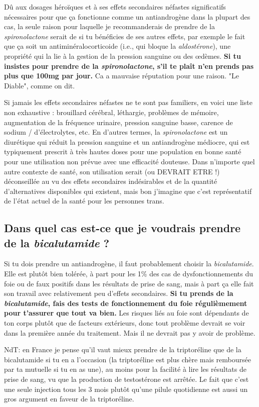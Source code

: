 \documentclass{article}
\begin{document}
Dû aux dosages héroïques et à ses effets secondaires néfastes significatifs nécessaires pour que ça fonctionne comme un antiandrogène dans la plupart des cas, la seule raison pour laquelle je recommanderais de prendre de la \textit{spironolactone} serait de si tu bénéficies de ses autres effets, par exemple le fait que ça soit un antiminéralocorticoide (i.e., qui bloque la \textit{aldostérone}), une propriété qui la lie à la gestion de la pression sanguine ou des œdèmes. \textbf{Si tu insistes pour prendre de la \textit{spironolactone}, s'il te plaît n'en prends pas plus que 100mg par jour.} Ca a mauvaise réputation pour une raison. "Le Diable", comme on dit.

Si jamais les effets secondaires néfastes ne te sont pas familiers, en voici une liste non exhaustive : brouillard cérébral, léthargie, problèmes de mémoire, augmentation de la fréquence urinaire, pression sanguine basse, carence de sodium / d'électrolytes, etc. En d'autres termes, la \textit{spironolactone} est un diurétique qui réduit la pression sanguine et un antiandrogène médiocre, qui est typiquement prescrit à très hautes doses pour une population en bonne santé pour une utilisation non prévue avec une efficacité douteuse. Dans n'importe quel autre contexte de santé, son utilisation serait (ou DEVRAIT ETRE !) déconseillée au vu des effets secondaires indésirables et de la quantité d'alternatives disponibles qui existent, mais bon j'imagine que c'est représentatif de l'état actuel de la santé pour les personnes trans.

\subsection{Dans quel cas est-ce que je voudrais prendre de la \textit{bicalutamide} ?}

Si tu dois prendre un antiandrogène, il faut probablement choisir la \textit{bicalutamide}. Elle est plutôt bien tolérée, à part pour les 1\% des cas de dysfonctionnements du foie ou de faux positifs dans les résultats de prise de sang, mais à part ça elle fait son travail avec relativement peu d'effets secondaires. \textbf{Si tu prends de la \textit{bicalutamide}, fais des tests de fonctionnement du foie régulièmement pour t'assurer que tout va bien.} Les risques liés au foie sont dépendants de ton corps plutôt que de facteurs extérieurs, donc tout problème devrait se voir dans la première année du traitement. Mais il ne devrait pas y avoir de problème.

NdT: en France je pense qu'il vaut mieux prendre de la triptoréline que de la bicalutamide si tu en a l'occasion (la triptoréline est plus chère mais remboursée par ta mutuelle si tu en as une), au moins pour la facilité à lire les résultats de prise de sang, vu que la production de testostérone est arrêtée. Le fait que c'est une seule injection tous les 3 mois plutôt qu'une pilule quotidienne est aussi un gros argument en faveur de la triptoréline.
\end{document}
